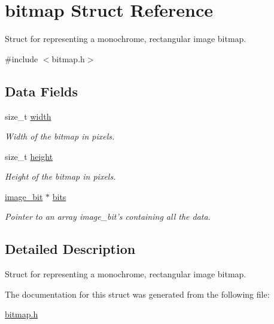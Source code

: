 \hypertarget{structbitmap}{
\section{bitmap Struct Reference}
\label{structbitmap}
}


Struct for representing a monochrome, rectangular image bitmap.  




{\ttfamily \#include $<$bitmap.h$>$}

\subsection*{Data Fields}
\begin{DoxyCompactItemize}
\item 
\hypertarget{structbitmap_a6ec205e8b2ef8d091ad791bd83d5bc14}{
size\_\-t \hyperlink{structbitmap_a6ec205e8b2ef8d091ad791bd83d5bc14}{width}}
\label{structbitmap_a6ec205e8b2ef8d091ad791bd83d5bc14}

\begin{DoxyCompactList}\small\item\em Width of the bitmap in pixels. \end{DoxyCompactList}\item 
\hypertarget{structbitmap_adf088ebc8e0a1761a1bfd1d65ba6b911}{
size\_\-t \hyperlink{structbitmap_adf088ebc8e0a1761a1bfd1d65ba6b911}{height}}
\label{structbitmap_adf088ebc8e0a1761a1bfd1d65ba6b911}

\begin{DoxyCompactList}\small\item\em Height of the bitmap in pixels. \end{DoxyCompactList}\item 
\hypertarget{structbitmap_ab8ae65b0353110273905f489895bad6a}{
\hyperlink{bitmap_8h_abb0a6c6bdf6faffa9e3773e1d687d67b}{image\_\-bit} $\ast$ \hyperlink{structbitmap_ab8ae65b0353110273905f489895bad6a}{bits}}
\label{structbitmap_ab8ae65b0353110273905f489895bad6a}

\begin{DoxyCompactList}\small\item\em Pointer to an array image\_\-bit's containing all the data. \end{DoxyCompactList}\end{DoxyCompactItemize}


\subsection{Detailed Description}
Struct for representing a monochrome, rectangular image bitmap. 

The documentation for this struct was generated from the following file:\begin{DoxyCompactItemize}
\item 
\hyperlink{bitmap_8h}{bitmap.h}\end{DoxyCompactItemize}
